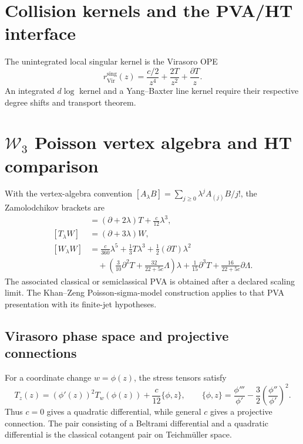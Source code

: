 \section{Collision kernels and the PVA/HT interface}

\begin{computation}
\label{comp:virasoro-rmatrix}
The unintegrated local singular kernel is the Virasoro OPE
\[
r_{\mathrm{Vir}}^{\mathrm{sing}}(z)
=\frac{c/2}{z^4}+\frac{2T}{z^2}+\frac{\partial T}{z}.
\]
An integrated $d\log$ kernel and a Yang--Baxter line kernel require
their respective degree shifts and transport theorem.
\end{computation}

\section{$\mathcal W_3$ Poisson vertex algebra and HT comparison}
\label{sec:w3-pva-holography}

With the vertex-algebra convention
$[A_\lambda B]=\sum_{j\ge0}\lambda^jA_{(j)}B/{j!}$, the
Zamolodchikov brackets are
\begin{align}
[T_\lambda T]&=(\partial+2\lambda)T+\frac c{12}\lambda^3,\nonumber\\
[T_\lambda W]&=(\partial+3\lambda)W,\nonumber\\
[W_\lambda W]&=\frac c{360}\lambda^5
+\frac13T\lambda^3+\frac12(\partial T)\lambda^2\nonumber\\
&\quad+\left(\frac3{10}\partial^2T+\frac{32}{22+5c}\Lambda\right)\lambda
+\frac1{15}\partial^3T+\frac{16}{22+5c}\partial\Lambda.
\label{eq:w3-lambda-bracket-repaired}
\end{align}
The associated classical or semiclassical PVA is obtained after a
declared scaling limit.  The Khan--Zeng Poisson-sigma-model
construction applies to that PVA presentation with its finite-jet
hypotheses.

\subsection{Virasoro phase space and projective connections}
\label{subsec:virasoro-teichmuller-phase-space}

\begin{proposition}
\label{prop:schwarzian-central-charge}
For a coordinate change $w=\phi(z)$, the stress tensors satisfy
\begin{equation}\label{eq:schwarzian-transformation}
T_z(z)=(\phi'(z))^2T_w(\phi(z))
+\frac c{12}\{\phi,z\},
\qquad
\{\phi,z\}=\frac{\phi'''}{\phi'}
-\frac32\left(\frac{\phi''}{\phi'}\right)^2.
\end{equation}
Thus $c=0$ gives a quadratic differential, while general $c$ gives a
projective connection.  The pair consisting of a Beltrami
differential and a quadratic differential is the classical cotangent
pair on Teichm\"uller space.
\end{proposition}

